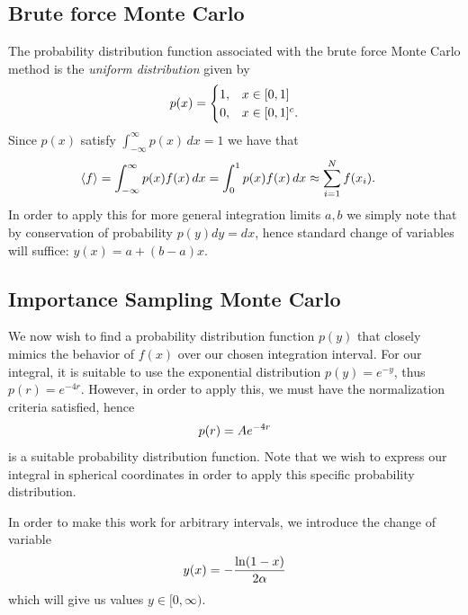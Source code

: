 \documentclass[intlimits]{amsart}
\begin{document}
\subsection{Brute force Monte Carlo}
\label{sub:brute_force_monte_carlo}

The probability distribution function associated with the brute force Monte Carlo method is
the \emph{uniform distribution} given by
\begin{equation}
  \notag
  p(x) = \begin{cases}
    1, & x \in [0, 1] \\
    0, & x \in [0, 1]^c.
  \end{cases}
\end{equation}
Since $p(x)$ satisfy $\int_{-\infty}^\infty p(x) \, dx = 1$ we have that
\begin{align*}
  \notag
  \langle f \rangle = \int_{-\infty}^\infty p(x) f(x) \, dx = \int_0^1 p(x)f(x) \, dx &\approx \sum^{N}_{i=1} f(x_i).
\end{align*}
In order to apply this for more general integration limits $a, b$ we simply
note that by conservation of probability $p(y)dy = dx$, hence standard change
of variables will suffice: $y(x) = a + (b - a)x$.

\subsection{Importance Sampling Monte Carlo}
\label{sub:importance_sampling_monte_carlo}

We now wish to find a probability distribution function $p(y)$ that closely
mimics the behavior of $f(x)$ over our chosen integration interval.
For our integral, it is suitable to use the exponential distribution $p(y) = e^{-y}$, thus
$p(r) = e^{-4r}$. However, in order to apply this, we must have the normalization criteria satisfied, hence
\begin{equation}
  \notag
  p(r) = Ae^{-4r}
\end{equation} 
is a suitable probability distribution function. Note that we
wish to express our integral in spherical coordinates in order to apply this
specific probability distribution.

In order to make this work for arbitrary intervals, we introduce the change of variable
\begin{equation}
  \notag
  y(x) = -\frac{\ln(1 - x)}{2\alpha}
\end{equation}
which will give us values $y \in [0, \infty)$.
\end{document}
